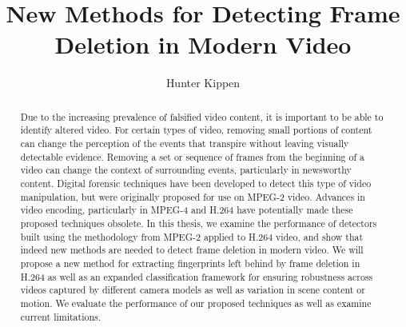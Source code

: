 \documentclass[subfig,blackref,approvalform]{drexel-thesis}
\author{Hunter Kippen}
\title{New Methods for Detecting Frame Deletion in Modern Video}
\begin{document}
\begin{DUTpreamble} %



\tableofcontents
\listoftables
\listoffigures

\begin{abstract}

Due to the increasing prevalence of falsified video content, it is important to be able to identify altered video. For certain types of video, removing small portions of content can change the perception of the events that transpire without leaving visually detectable evidence. Removing a set or sequence of frames from the beginning of a video can change the context of surrounding events, particularly in newsworthy content. Digital forensic techniques have been developed to detect this type of video manipulation, but were originally proposed for use on MPEG-2 video. Advances in video encoding, particularly in MPEG-4 and H.264 have potentially made these proposed techniques obsolete. In this thesis, we examine the performance of detectors built using the methodology from MPEG-2 applied to H.264 video, and show that indeed new methods are needed to detect frame deletion in modern video. We will propose a new method for extracting fingerprints left behind by frame deletion in H.264 as well as an expanded classification framework for ensuring robustness across videos captured by different camera models as well as variation in scene content or motion. We evaluate the performance of our proposed techniques as well as examine current limitations.

\end{abstract}
\end{DUTpreamble}

\begin{thesis}






\end{thesis}

\printbibliography
%

%

\end{document}
